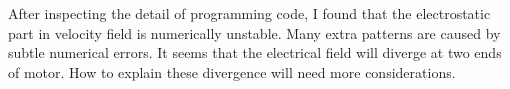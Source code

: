 \documentclass[fontsize=11pt, %
                             paper=a4, %
                             twoside, %
                             captions=tableheading,
                             index=totoc,
                             hyperref]{labbook}
\begin{document}
\begin{addmargin}[4cm]{0cm}
After inspecting the detail of programming code, I found that the electrostatic part in velocity field is numerically unstable. Many extra patterns are caused by subtle numerical errors. It seems that the electrical field will diverge at two ends of motor. How to explain these divergence will need more considerations.





\end{addmargin}
\end{document}
